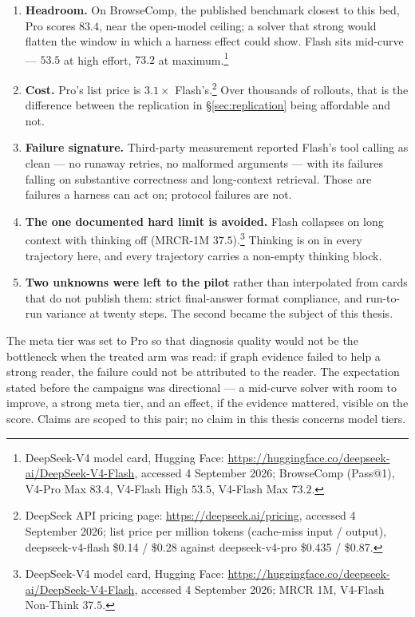 \begin{enumerate}
  \item \textbf{Headroom.} On BrowseComp, the published benchmark closest
        to this bed, Pro scores $83.4$, near the open-model ceiling; a
        solver that strong would flatten the window in which a harness
        effect could show. Flash sits mid-curve --- $53.5$ at high effort,
        $73.2$ at maximum.\footnote{DeepSeek-V4 model card, Hugging Face:
        \url{https://huggingface.co/deepseek-ai/DeepSeek-V4-Flash},
        accessed 4 September 2026; BrowseComp (Pass@1), V4-Pro Max
        $83.4$, V4-Flash High $53.5$, V4-Flash Max $73.2$.}
  \item \textbf{Cost.} Pro's list price is $3.1\times$ Flash's.\footnote{DeepSeek
        API pricing page: \url{https://deepseek.ai/pricing}, accessed 4
        September 2026; list price per million tokens (cache-miss input /
        output), deepseek-v4-flash \$0.14 / \$0.28 against
        deepseek-v4-pro \$0.435 / \$0.87.} Over thousands of rollouts,
        that is the difference between the replication in
        \S\ref{sec:replication} being affordable and not.
  \item \textbf{Failure signature.} Third-party measurement reported
        Flash's tool calling as clean --- no runaway retries, no malformed
        arguments --- with its failures falling on substantive correctness
        and long-context retrieval. Those are failures a harness can act
        on; protocol failures are not.
  \item \textbf{The one documented hard limit is avoided.} Flash collapses
        on long context with thinking off (MRCR-1M $37.5$).\footnote{DeepSeek-V4
        model card, Hugging Face:
        \url{https://huggingface.co/deepseek-ai/DeepSeek-V4-Flash},
        accessed 4 September 2026; MRCR 1M, V4-Flash Non-Think $37.5$.}
        Thinking is on
        in every trajectory here, and every trajectory carries a
        non-empty thinking block.
  \item \textbf{Two unknowns were left to the pilot} rather than
        interpolated from cards that do not publish them: strict
        final-answer format compliance, and run-to-run variance at twenty
        steps. The second became the subject of this thesis.
\end{enumerate}

The meta tier was set to Pro so that diagnosis quality would not be the
bottleneck when the treated arm was read: if graph evidence failed to help
a strong reader, the failure could not be attributed to the reader. The
expectation stated before the campaigns was directional --- a mid-curve
solver with room to improve, a strong meta tier, and an effect, if the
evidence mattered, visible on the score. Claims are scoped to this pair;
no claim in this thesis concerns model tiers.

